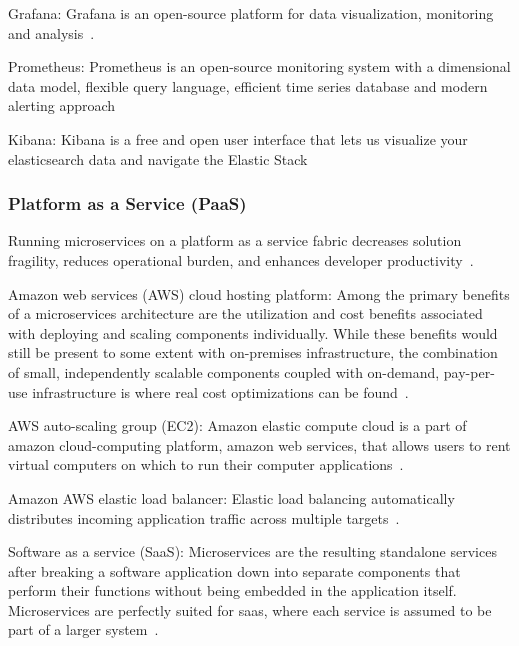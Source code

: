 \par Grafana: Grafana is an open-source platform for data visualization, monitoring and analysis~\cite{KalskeM2017,Kalske2017}. 

\par Prometheus: Prometheus is an open-source monitoring system with a dimensional data model, flexible query language, efficient time series database and modern alerting approach~\cite{KalskeM2017, Kalske2017} 

\par Kibana: Kibana is a free and open user interface that lets us visualize your elasticsearch data and navigate the Elastic Stack~\cite{KalskeM2017, Kalske2017} 


\subsubsection{Platform as a Service (PaaS)}

Running microservices on a platform as a service fabric decreases solution fragility, reduces operational burden, and enhances developer productivity~\cite{rosa2018, Mikail2020}.

\par Amazon web services (AWS) cloud hosting platform: Among the primary benefits of a microservices architecture are the utilization and cost benefits associated with deploying and scaling components individually. While these benefits would still be present to some extent with on-premises infrastructure, the combination of small, independently scalable components coupled with on-demand, pay-per-use infrastructure is where real cost optimizations can be found~\cite{McElhiney2018}.

\par AWS auto-scaling group (EC2): Amazon elastic compute cloud is a part of amazon cloud-computing platform, amazon web services, that allows users to rent virtual computers on which to run their computer applications~\cite{McElhiney2018}.

\par Amazon AWS elastic load balancer: Elastic load balancing automatically distributes incoming application traffic across multiple targets~\cite{McElhiney2018}.

\par Software as a service (SaaS): Microservices are the resulting standalone services after breaking a software application down into separate components that perform their functions without being embedded in the application itself. Microservices are perfectly suited for saas, where each service is assumed to be part of a larger system~\cite{haugeland2020}.


